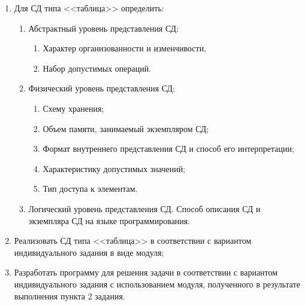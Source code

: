 \documentclass[12pt]{article}
\begin{document}
	\begin{enumerate}
	
	\item Для СД типа <<таблица>> определить:
	
		\begin{enumerate}
	
			\item Абстрактный уровень представления СД:
			
			\begin{enumerate}
	
				\item Характер организованности и изменчивости, 
	
				\item Набор допустимых операций.
			
			\end{enumerate}
	
			\item Физический уровень представления СД:
			
			\begin{enumerate}
	
				\item Схему хранения;
	
				\item Объем памяти, занимаемый экземпляром СД;
	
				\item Формат внутреннего представления СД и способ его  интерпретации;
				
				\item Характеристику допустимых значений;
				
				\item Тип доступа к элементам.
				
			\end{enumerate}
			
			\item Логический уровень представления СД. Способ описания СД и экземпляра СД на языке программирования.
	
		\end{enumerate}
	
	\item Реализовать СД типа <<таблица>> в соответствии с вариантом индивидуального задания в виде модуля;
	
	\item Разработать программу для решения задачи в соответствии с вариантом индивидуального задания с использованием модуля, полученного в результате выполнения пункта 2 задания.
	
	\end{enumerate}
	
\end{document}
